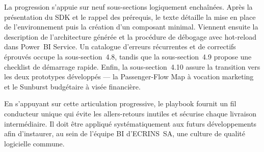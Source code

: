 La progression s’appuie sur neuf sous-sections logiquement enchaînées. Après la présentation du SDK et le rappel des prérequis, le texte détaille la mise en place de l’environnement puis la création d’un composant minimal. Viennent ensuite la description de l’architecture générée et la procédure de débogage avec hot-reload dans Power~BI Service. Un catalogue d’erreurs récurrentes et de correctifs éprouvés occupe la sous-section~4.8, tandis que la sous-section~4.9 propose une checklist de démarrage rapide. Enfin, la sous-section~4.10 assure la transition vers les deux prototypes développés — la Passenger-Flow Map à vocation marketing et le Sunburst budgétaire à visée financière.

En s’appuyant sur cette articulation progressive, le playbook fournit un fil conducteur unique qui évite les allers-retours inutiles et sécurise chaque livraison intermédiaire. Il doit être appliqué systématiquement aux futurs développements afin d’instaurer, au sein de l’équipe BI d’ECRINS~SA, une culture de qualité logicielle commune.
